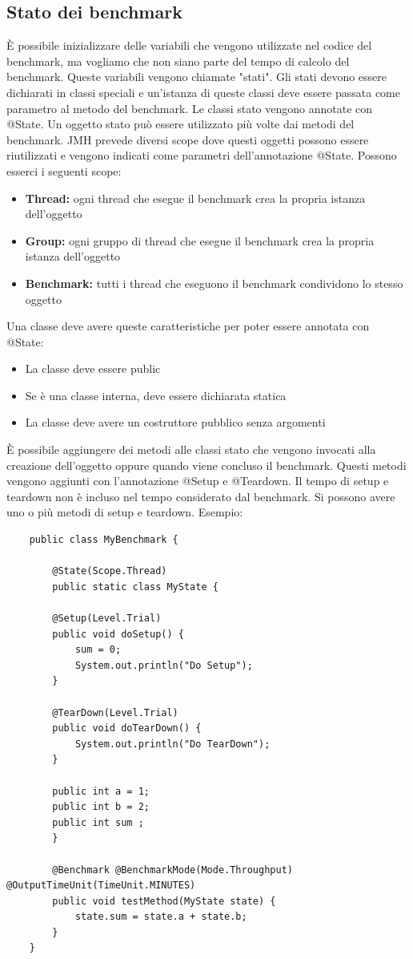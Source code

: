 \documentclass[a4paper, 11pt,            %
openright,               %
italian,
english                 
]{article}       %
\begin{document}
	\subsection{Stato dei benchmark}
	È possibile inizializzare delle variabili che vengono utilizzate nel codice del benchmark, ma vogliamo che non siano parte del tempo di calcolo del benchmark. Queste variabili vengono chiamate "stati". Gli stati devono essere dichiarati in classi speciali e un'istanza di queste classi deve essere passata come parametro al metodo del benchmark. Le classi stato vengono annotate con @State.
	Un oggetto stato può essere utilizzato più volte dai metodi del benchmark. JMH prevede diversi scope dove questi oggetti possono essere riutilizzati e vengono indicati come parametri dell'annotazione @State.
	Possono esserci i seguenti scope:
	\begin{itemize}
		\item \textbf{Thread: } ogni thread che esegue il benchmark crea la propria istanza dell'oggetto
		\item \textbf{Group: } ogni gruppo di thread che esegue il benchmark crea la propria istanza dell'oggetto
		\item \textbf{Benchmark: } tutti i thread che eseguono il benchmark condividono lo stesso oggetto
	\end{itemize}
	Una classe deve avere queste caratteristiche per poter essere annotata con @State: 
	\begin{itemize}
		\item La classe deve essere public
		\item Se è una classe interna, deve essere dichiarata statica
		\item La classe deve avere un costruttore pubblico senza argomenti
	\end{itemize}
	
	È possibile aggiungere dei metodi alle classi stato che vengono invocati alla creazione dell'oggetto oppure quando viene concluso il benchmark. Questi metodi vengono aggiunti con l'annotazione @Setup e @Teardown.
	Il tempo di setup e teardown non è incluso nel tempo considerato dal benchmark. Si possono avere uno o più metodi di setup e teardown. Esempio:
	
	\begin{lstlisting}
	public class MyBenchmark {
		
		@State(Scope.Thread)
		public static class MyState {
		
		@Setup(Level.Trial)
		public void doSetup() {
			sum = 0;
			System.out.println("Do Setup");
		}
		
		@TearDown(Level.Trial)
		public void doTearDown() {
			System.out.println("Do TearDown");
		}
		
		public int a = 1;
		public int b = 2;
		public int sum ;
		}
		
		@Benchmark @BenchmarkMode(Mode.Throughput) @OutputTimeUnit(TimeUnit.MINUTES)
		public void testMethod(MyState state) {
			state.sum = state.a + state.b;
		}
	}
	\end{lstlisting}
	
\end{document}
